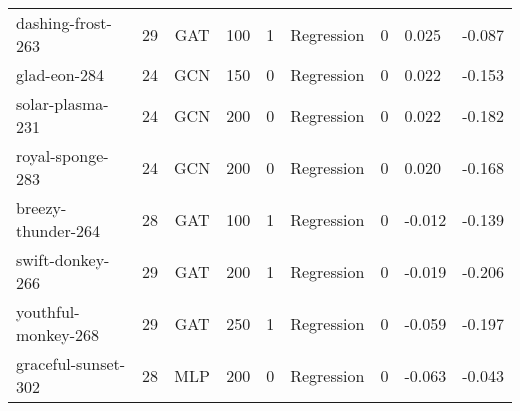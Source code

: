 \begin{table}
\begin{tabular}{lcccccc}
dashing-frost-263 & 29 & GAT & 100 & 1 & Regression & 0 & 0.025 & -0.087 \\
glad-eon-284 & 24 & GCN & 150 & 0 & Regression & 0 & 0.022 & -0.153 \\
solar-plasma-231 & 24 & GCN & 200 & 0 & Regression & 0 & 0.022 & -0.182 \\
royal-sponge-283 & 24 & GCN & 200 & 0 & Regression & 0 & 0.020 & -0.168 \\
breezy-thunder-264 & 28 & GAT & 100 & 1 & Regression & 0 & -0.012 & -0.139 \\
swift-donkey-266 & 29 & GAT & 200 & 1 & Regression & 0 & -0.019 & -0.206 \\
youthful-monkey-268 & 29 & GAT & 250 & 1 & Regression & 0 & -0.059 & -0.197 \\
graceful-sunset-302 & 28 & MLP & 200 & 0 & Regression & 0 & -0.063 & -0.043 \\
\bottomrule
\end{tabular}
\end{table}
